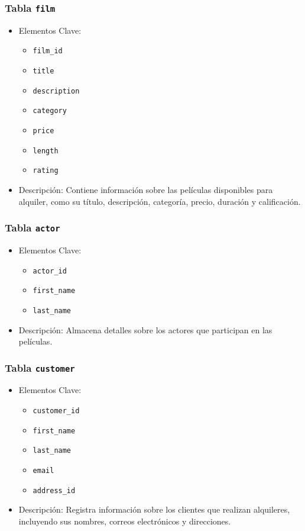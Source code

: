 \documentclass[11pt]{report}
\begin{document}
		\subsubsection{Tabla \texttt{film}}
		\begin{itemize}
		  \item Elementos Clave:
		  \begin{itemize}
			\item \texttt{film\_id}
			\item \texttt{title}
			\item \texttt{description}
			\item \texttt{category}
			\item \texttt{price}
			\item \texttt{length}
			\item \texttt{rating}
		  \end{itemize}
		  \item Descripción: Contiene información sobre las películas disponibles para alquiler, como su título, descripción, categoría, precio, duración y calificación.
		\end{itemize}
		
		\subsubsection{Tabla \texttt{actor}}
		\begin{itemize}
		  \item Elementos Clave:
		  \begin{itemize}
			\item \texttt{actor\_id}
			\item \texttt{first\_name}
			\item \texttt{last\_name}
		  \end{itemize}
		  \item Descripción: Almacena detalles sobre los actores que participan en las películas.
		\end{itemize}

		\subsubsection{Tabla \texttt{customer}}
		\begin{itemize}
		  \item Elementos Clave:
		  \begin{itemize}
			\item \texttt{customer\_id}
			\item \texttt{first\_name}
			\item \texttt{last\_name}
			\item \texttt{email}
			\item \texttt{address\_id}
		  \end{itemize}
		  \item Descripción: Registra información sobre los clientes que realizan alquileres, incluyendo sus nombres, correos electrónicos y direcciones.
		\end{itemize}
		
\end{document}
